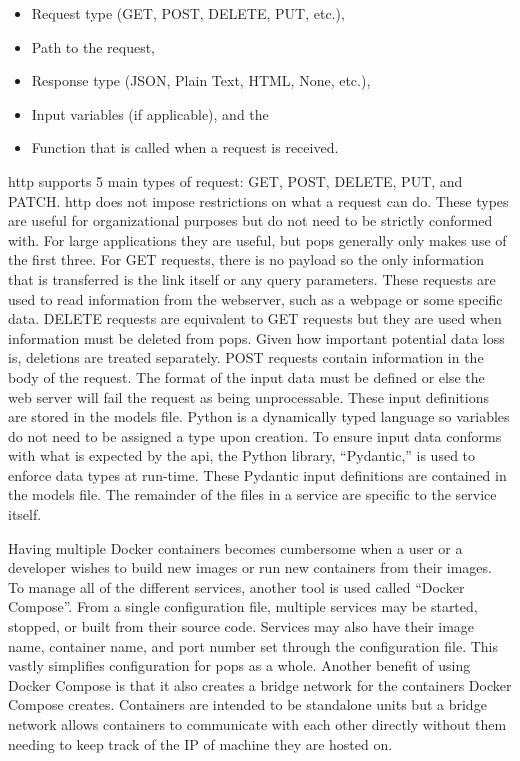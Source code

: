 \begin{itemize}
    \item Request type (GET, POST, DELETE, PUT, etc.), 
    \item Path to the request, 
    \item Response type (JSON, Plain Text, HTML, None, etc.), 
    \item Input variables (if applicable), and the 
    \item Function that is called when a request is received.
\end{itemize}

\gls{http} supports 5 main types of request: GET, POST, DELETE, PUT, and PATCH.
\gls{http} does not impose restrictions on what a request can do. These types
are useful for organizational purposes but do not need to be strictly conformed
with. For large applications they are useful, but \gls{pops} generally only
makes use of the first three.  For GET requests, there is no payload so the
only information that is transferred is the link itself or any query
parameters.  These requests are used to read information from the webserver,
such as a webpage or some specific data. DELETE requests are equivalent to GET
requests but they are used when information must be deleted from \gls{pops}.
Given how important potential data loss is, deletions are treated separately.
POST requests contain information in the body of the request.  The format of
the input data must be defined or else the web server will fail the request as
being unprocessable.  These input definitions are stored in the models file.
Python is a dynamically typed language so variables do not need to be assigned
a type upon creation. To ensure input data conforms with what is expected by
the \gls{api}, the Python library, ``Pydantic,'' is used to enforce data types
at run-time.  These Pydantic input definitions are contained in the models
file.  The remainder of the files in a service are specific to the service
itself.

Having multiple Docker containers becomes cumbersome when a user or a developer
wishes to build new images or run new containers from their images. To manage
all of the different services, another tool is used called ``Docker Compose''.
From a single configuration file, multiple services may be started, stopped, or
built from their source code. Services may also have their image name,
container name, and port number set through the configuration file. This vastly
simplifies configuration for \gls{pops} as a whole. Another benefit of using
Docker Compose is that it also creates a bridge network for the containers
Docker Compose creates. Containers are intended to be standalone units but a
bridge network allows containers to communicate with each other directly
without them needing to keep track of the IP of machine they are hosted on.

